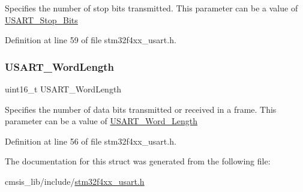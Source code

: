 Specifies the number of stop bits transmitted. This parameter can be a value of \hyperlink{group___u_s_a_r_t___stop___bits}{U\+S\+A\+R\+T\+\_\+\+Stop\+\_\+\+Bits} 

Definition at line 59 of file stm32f4xx\+\_\+usart.\+h.

\mbox{\label{struct_u_s_a_r_t___init_type_def_aa1248b67914e095c0de768223eea9328}} 
\subsubsection{\texorpdfstring{U\+S\+A\+R\+T\+\_\+\+Word\+Length}{USART\_WordLength}}
{\footnotesize\ttfamily uint16\+\_\+t U\+S\+A\+R\+T\+\_\+\+Word\+Length}

Specifies the number of data bits transmitted or received in a frame. This parameter can be a value of \hyperlink{group___u_s_a_r_t___word___length}{U\+S\+A\+R\+T\+\_\+\+Word\+\_\+\+Length} 

Definition at line 56 of file stm32f4xx\+\_\+usart.\+h.



The documentation for this struct was generated from the following file\+:\begin{DoxyCompactItemize}
\item 
cmsis\+\_\+lib/include/\hyperlink{stm32f4xx__usart_8h}{stm32f4xx\+\_\+usart.\+h}\end{DoxyCompactItemize}
